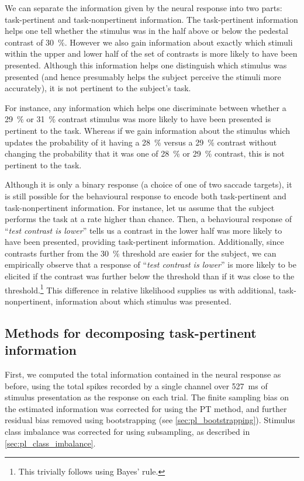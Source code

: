 We can separate the information given by the neural response into two parts: task-pertinent and task-nonpertinent information.
The task-pertinent information helps one tell whether the stimulus was in the half above or below the pedestal contrast of \SI{30}{\percent}.
However we also gain information about exactly which stimuli within the upper and lower half of the set of contrasts is more likely to have been presented.
Although this information helps one distinguish which stimulus was presented (and hence presumably helps the subject perceive the stimuli more accurately), it is not pertinent to the subject's task.

For instance, any information which helps one discriminate between whether a \SI{29}{\percent} or \SI{31}{\percent} contrast stimulus was more likely to have been presented is pertinent to the task.
Whereas if we gain information about the stimulus which updates the probability of it having a \SI{28}{\percent} versus a \SI{29}{\percent} contrast without changing the probability that it was one of \SI{28}{\percent} or \SI{29}{\percent} contrast, this is not pertinent to the task.

Although it is only a binary response (a choice of one of two saccade targets), it is still possible for the behavioural response to encode both task-pertinent and task-nonpertinent information.
For instance, let us assume that the subject performs the task at a rate higher than chance.
Then, a behavioural response of ``\textit{test contrast is lower}'' tells us a contrast in the lower half was more likely to have been presented, providing task-pertinent information.
Additionally, since contrasts further from the \SI{30}{\percent} threshold are easier for the subject, we can empirically observe that a response of ``\textit{test contrast is lower}'' is more likely to be elicited if the contrast was further below the threshold than if it was close to the threshold.\footnote{This trivially follows using Bayes' rule.}
This difference in relative likelihood supplies us with additional, task-nonpertinent, information about which stimulus was presented.


\subsection{Methods for decomposing task-pertinent information}
\label{sec:task-info-methods}

First, we computed the total information contained in the neural response as before, using the total spikes recorded by a single channel over \SI{527}{\milli\second} of stimulus presentation as the response on each trial.
The finite sampling bias on the estimated information was corrected for using the \ac{PT} method, and further residual bias removed using bootstrapping (see \autoref{sec:pl_bootstrapping}).
Stimulus class imbalance was corrected for using subsampling, as described in \autoref{sec:pl_class_imbalance}.

